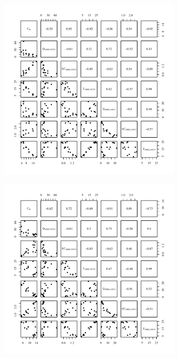 \begin{linenumbers}
\subfiguretop
\begin{landscape}
	\begin{figure}
		\begin{subfigure}{0.7\textwidth}
			\centering
			\includegraphics[width=\tableCustomSize]{"Figures/Results_USR/Stochastic/Conc Model Full PairsU163"}
		\end{subfigure}%
		\begin{subfigure}{0.7\textwidth}
			\centering
			\includegraphics[width=\tableCustomSize]{"Figures/Results_USR/Stochastic/Conc Model Full PairsU201"}

\end{subfigure}
\end{figure}
\end{landscape}
\end{linenumbers}
